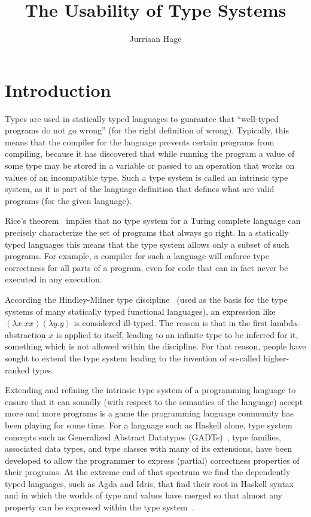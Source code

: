 \documentclass[sigplan,10pt,noacm]{acmart}
\begin{document}
\title{The Usability of Type Systems}
\author{Jurriaan Hage}

\maketitle


\section{Introduction}

Types are used in statically typed languages to guarantee that
``well-typed programs do not go wrong'' (for the right definition of
wrong). Typically, this means that the compiler for the language
prevents certain programs from compiling, because it has discovered
that while running the program a value of some type may be stored
in a variable or passed to an operation that
works on values of an incompatible type. Such a type system is called an 
intrinsic type system,
as it is part of the language definition that defines what are valid
programs (for the given language). 

Rice's theorem~\cite{} implies that no type system for a Turing complete
language can precisely characterize the set of programs that always go right.
In a statically typed languages this means that the type system allows
only a subset of such programs. For example, a compiler for such a language
will enforce type correctness for all parts of a program, even for code
that can in fact never be executed in any execution.

According the Hindley-Milner type discipline~\cite{} (used as the basis
for the type systems of many statically typed functional languages), 
an expression like $(\lambda x . x x) (\lambda y. y)$ is considered
ill-typed. The reason is that in the first lambda-abstraction $x$ is applied
to itself, leading to an infinite type to be inferred for it, something which
is not allowed within the discipline. For that reason, people have sought
to extend the type system leading to the invention of so-called higher-ranked types.

Extending and refining the intrinsic type system of a programming language to 
ensure that it can soundly (with respect to the semantics of the language)
accept more and more programs is a game the programming language community
has been playing for some time. For a language such as Haskell alone, type system
concepts such as Generalized Abstract Datatypes (GADTs)~\cite{}, type families,
associated data types, and type classes with many of its extensions, 
have been developed to allow the programmer to express (partial) correctness
properties of their programs. At the extreme end of that spectrum we find
the dependently typed languages, such as Agda and Idris, that find their 
root in Haskell syntax and in which the worlds of type and values have
merged so that almost any property can be expressed within the 
type system~\cite{wouter}.
\end{document}
